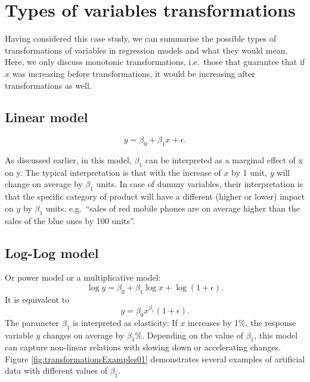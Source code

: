 \documentclass[
]{book}
\theoremstyle{definition}
\theoremstyle{definition}
\theoremstyle{definition}
\theoremstyle{definition}
\theoremstyle{remark}
\begin{document}
\section{Types of variables transformations}\label{types-of-variables-transformations}

Having considered this case study, we can summarise the possible types of transformations of variables in regression models and what they would mean. Here, we only discuss monotonic transformations, i.e.~those that guarantee that if \(x\) was increasing before transformations, it would be increasing after transformations as well.

\subsection{Linear model}\label{linear-model}

\begin{equation}
    y = \beta_0 + \beta_1 x + \epsilon .
    \label{eq:transformLinear}
\end{equation}

As discussed earlier, in this model, \(\beta_1\) can be interpreted as a marginal effect of x on y. The typical interpretation is that with the increase of \(x\) by 1 unit, \(y\) will change on average by \(\beta_1\) units. In case of dummy variables, their interpretation is that the specific category of product will have a different (higher or lower) impact on \(y\) by \(\beta_1\) units. e.g.~``sales of red mobile phones are on average higher than the sales of the blue ones by 100 units''.

\subsection{Log-Log model}\label{log-log-model}

Or power model or a multiplicative model:
\begin{equation}
    \log y = \beta_0 + \beta_1 \log x + \log (1+\epsilon) .
    \label{eq:transformLogLog}
\end{equation}
It is equivalent to
\begin{equation}
    y = \beta_0 x^{\beta_1} (1+\epsilon) .
    \label{eq:transformMultiplicative}
\end{equation}
The parameter \(\beta_1\) is interpreted as elasticity: If \(x\) increases by 1\%, the response variable \(y\) changes on average by \(\beta_1\)\%. Depending on the value of \(\beta_1\), this model can capture non-linear relations with slowing down or accelerating changes. Figure \ref{fig:transformationsExamples01} demonstrates several examples of artificial data with different values of \(\beta_1\).
\end{document}
